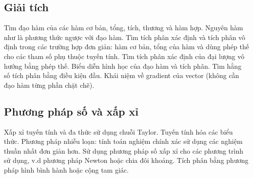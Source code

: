 \documentclass{article}
\begin{document}
\begin{multicols}{2}
\subsection{Giải tích}
Tìm đạo hàm của các hàm cơ bản, tổng, tích, thương và hàm hợp. Nguyên hàm như là phương thức ngược với đạo hàm. Tìm tích phân xác định và tích phân vô định trong các trường hợp đơn giản: hàm cơ bản, tổng của hàm và dùng phép thế cho các tham số phụ thuộc tuyến tính. Tìm tích phân xác định của đại lượng vô hướng bằng phép thế. Biểu diễn hình học của đạo hàm và tích phân. Tìm hằng số tích phân bằng điều kiện đầu. Khái niệm về gradient của vector (không cần đạo hàm từng phần chặt chẽ).

\subsection{Phương pháp số và xấp xỉ}
Xấp xỉ tuyến tính và đa thức sử dụng chuỗi Taylor. Tuyến tính hóa các biểu thức. Phương pháp nhiễu loạn: tính toán nghiệm chính xác sử dụng các nghiệm thuần nhất đơn giản hơn. Sử dụng phương pháp số xấp xỉ cho các phương trình sử dụng, v.d phương pháp Newton hoặc chia đôi khoảng. Tích phân bằng phương pháp hình bình hành hoặc cộng tam giác.

\end{multicols}
\end{document}
